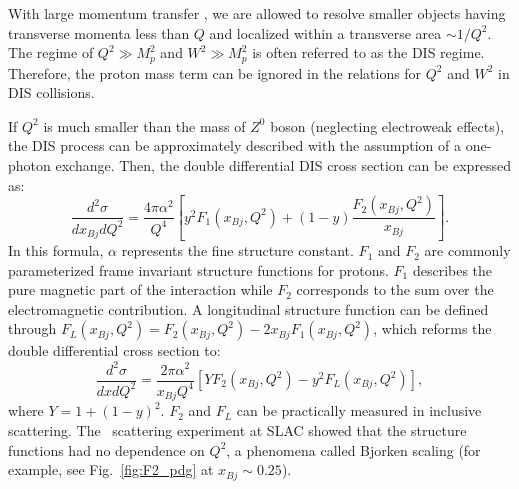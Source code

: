 With large momentum transfer \qsq, we are allowed to resolve smaller objects
having transverse momenta less than $Q$ and localized within a transverse
area $\sim 1/Q^{2}$.
The regime of $Q^{2}\gg M^{2}_{p}$ and $W^{2}\gg M^{2}_{p}$ is often referred
to as the DIS regime. Therefore, the proton mass term can be ignored in the relations
for $Q^{2}$ and $W^{2}$ in DIS collisions.

If $Q^{2}$ is much smaller than the mass of $Z^{0}$ boson (neglecting electroweak effects), the DIS process
can be approximately described with the assumption of a one-photon exchange. Then,
the double differential DIS cross section can be expressed as:
\begin{equation}
\frac{d^{2}\sigma}{dx_{Bj}dQ^{2}}=\frac{4\pi\alpha^{2}}{Q^{4}}[y^{2}F_{1}(x_{Bj},Q^{2})+(1-y)\frac{F_{2}(x_{Bj},Q^{2})}{x_{Bj}}].
\end{equation}
In this formula, $\alpha$ represents the fine structure constant. $F_{1}$ and
$F_{2}$ are commonly parameterized frame invariant structure functions for
protons. $F_{1}$ describes the pure magnetic part of the interaction while $F_{2}$
corresponds to the sum over the electromagnetic contribution. A longitudinal structure function can
be defined through $F_{L}(x_{Bj},Q^{2})=F_{2}(x_{Bj},Q^{2})-2x_{Bj}F_{1}(x_{Bj},Q^{2})$,
which reforms the double differential cross section to:
\begin{equation}
\frac{d^{2}\sigma}{dxdQ^{2}}=\frac{2\pi\alpha^{2}}{x_{Bj}Q^{4}}[YF_{2}(x_{Bj},Q^{2})-y^{2}F_{L}(x_{Bj},Q^{2})],
\end{equation}
where $Y=1+(1-y)^{2}$. $F_{2}$ and $F_{L}$ can be practically measured in
inclusive scattering. The \ep\ scattering experiment at SLAC showed that the
structure functions had no dependence on $Q^{2}$, a phenomena called Bjorken scaling 
(for example, see Fig.~\ref{fig:F2_pdg} at $x_{Bj}\sim0.25$).

